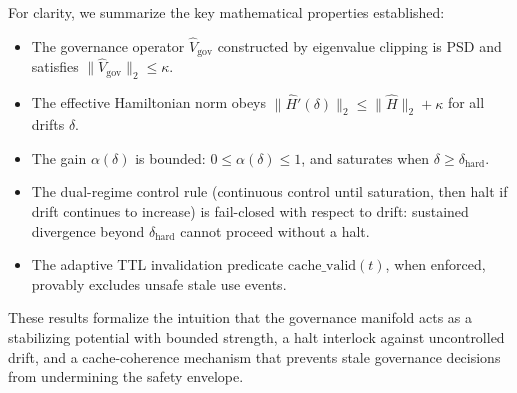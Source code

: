 \documentclass[11pt]{article}
\begin{document}
For clarity, we summarize the key mathematical properties established:

\begin{itemize}[noitemsep]
  \item The governance operator $\hat{V}_{\mathrm{gov}}$ constructed by eigenvalue clipping is PSD and satisfies $\|\hat{V}_{\mathrm{gov}}\|_2 \le \kappa$.
  \item The effective Hamiltonian norm obeys $\|\hat{H}'(\delta)\|_2 \le \|\hat{H}\|_2 + \kappa$ for all drifts $\delta$.
  \item The gain $\alpha(\delta)$ is bounded: $0 \le \alpha(\delta) \le 1$, and saturates when $\delta \ge \delta_{\mathrm{hard}}$.
  \item The dual-regime control rule (continuous control until saturation, then halt if drift continues to increase) is fail-closed with respect to drift: sustained divergence beyond $\delta_{\mathrm{hard}}$ cannot proceed without a halt.
  \item The adaptive TTL invalidation predicate $\mathrm{cache\_valid}(t)$, when enforced, provably excludes unsafe stale use events.
\end{itemize}

These results formalize the intuition that the governance manifold acts as a stabilizing potential with bounded strength, a halt interlock against uncontrolled drift, and a cache-coherence mechanism that prevents stale governance decisions from undermining the safety envelope.

\nocite{*}


\end{document}
